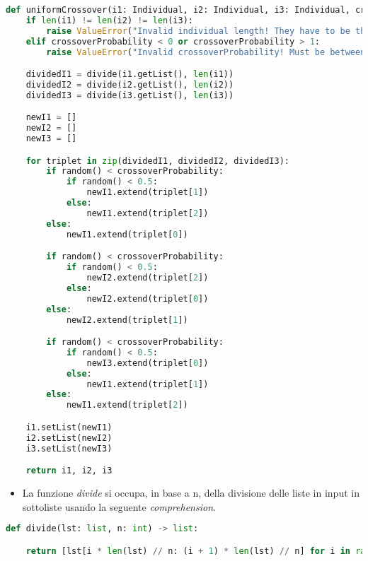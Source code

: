 \documentclass{article}
\begin{document}
\begin{lstlisting}[language=Python, breaklines, no caption]
def uniformCrossover(i1: Individual, i2: Individual, i3: Individual, crossoverProbability: float) -> tuple[Individual, Individual, Individual]:
    if len(i1) != len(i2) != len(i3):
        raise ValueError("Invalid individual length! They have to be the same.")
    elif crossoverProbability < 0 or crossoverProbability > 1:
        raise ValueError("Invalid crossoverProbability! Must be between 0 and 1.")

    dividedI1 = divide(i1.getList(), len(i1))
    dividedI2 = divide(i2.getList(), len(i2))
    dividedI3 = divide(i3.getList(), len(i3))

    newI1 = []
    newI2 = []
    newI3 = []

    for triplet in zip(dividedI1, dividedI2, dividedI3):
        if random() < crossoverProbability:
            if random() < 0.5:
                newI1.extend(triplet[1])
            else:
                newI1.extend(triplet[2])
        else:
            newI1.extend(triplet[0])

        if random() < crossoverProbability:
            if random() < 0.5:
                newI2.extend(triplet[2])
            else:
                newI2.extend(triplet[0])
        else:
            newI2.extend(triplet[1])

        if random() < crossoverProbability:
            if random() < 0.5:
                newI3.extend(triplet[0])
            else:
                newI1.extend(triplet[1])
        else:
            newI1.extend(triplet[2])

    i1.setList(newI1)
    i2.setList(newI2)
    i3.setList(newI3)

    return i1, i2, i3
        \end{lstlisting}

\begin{itemize}
\begin{itemize}
    \item La funzione \textit{divide} si occupa, in base a n, della divisione delle liste in input in sottoliste usando la seguente \textit{comprehension}.


\end{itemize}
     \begin{lstlisting}[language=Python, breaklines, no caption]
def divide(lst: list, n: int) -> list:

    return [lst[i * len(lst) // n: (i + 1) * len(lst) // n] for i in range(n)]
        \end{lstlisting}
\end{itemize}
\end{document}
